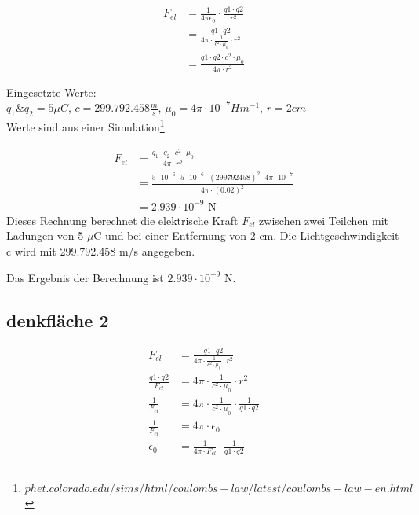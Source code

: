 \documentclass[a4paper]{report}
\begin{document}
\begin{align}
  F_{el} & = \frac{1}{4\pi \epsilon_0} \cdot \frac{q1 \cdot q2}{r^2}\\  
         & = \frac{q1 \cdot q2}{4\pi \cdot \frac{1}{c^2 \cdot \mu_0} \cdot r^2}\\
         & = \frac{q1 \cdot q2 \cdot c^2 \cdot \mu_0}{4\pi \cdot r^2}
\end{align}



Eingesetzte Werte:\\
$q_1 \& q_2 = 5 \mu C$, $c=299.792.458 \frac{m}{s}$, $\mu_0= 4 \pi \cdot 10^{-7}Hm^{-1}$, $r=2cm$\\
Werte sind aus einer Simulation\footnote{$phet.colorado.edu/sims/html/coulombs-law/latest/coulombs-law-en.html$}

\begin{align}
F_{el} &= \frac{q_1 \cdot q_2 \cdot c^2 \cdot \mu_0}{4\pi \cdot r^2} \\
       &= \frac{5\cdot10^{-6} \cdot 5\cdot10^{-6} \cdot (299792458)^2 \cdot 4\pi \cdot 10^{-7}}{4\pi \cdot (0.02)^2} \\
       &= 2.939\cdot10^{-9} \text{ N}
\end{align}
Dieses Rechnung berechnet die elektrische Kraft $F_{el}$ zwischen zwei Teilchen
mit Ladungen von 5 $\mu$C und bei einer Entfernung von 2 cm. Die
Lichtgeschwindigkeit c wird mit 299.792.458 m/s angegeben.

Das Ergebnis der Berechnung ist $2.939\cdot 10^{-9}$ N.

\subsection{denkfläche 2}
\begin{align}
F_{el} &= \frac{q1 \cdot q2}{4\pi \cdot \frac{1}{c^2 \cdot \mu_0} \cdot r^2} \\ %
\frac{q1 \cdot q2}{F_{el}} &= 4\pi \cdot \frac{1}{c^2 \cdot \mu_0} \cdot r^2 \\ %
\frac{1}{F_{el}} &= 4\pi \cdot \frac{1}{c^2 \cdot \mu_0} \cdot \frac{1}{q1 \cdot q2} \\ %
\frac{1}{F_{el}} &= 4\pi \cdot \epsilon_0 \\ %
\epsilon_0 &= \frac{1}{4\pi \cdot F_{el}} \cdot \frac{1}{q1 \cdot q2} %
\end{align}
\end{document}
